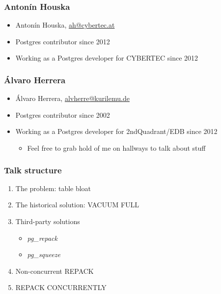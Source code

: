 \newcommand{\linksize}{\scriptsize}


\begin{frame}[plain]
  \titlepage
\end{frame}

\begin{frame}
	\frametitle{Antonín Houska}
  \begin{itemize}
    \item Antonín Houska, \href{mailto:ah@cybertec.at}{ah@cybertec.at}
    \item Postgres contributor since 2012
    \item Working as a Postgres developer for CYBERTEC since 2012
  \end{itemize}
\end{frame}

\begin{frame}
	\frametitle{Álvaro Herrera}
  \begin{itemize}
    \item Álvaro Herrera, \href{mailto:alvherre@kurilemu.de}{alvherre@kurilemu.de}
    \item Postgres contributor since 2002
    \item Working as a Postgres developer for 2ndQuadrant/EDB since 2012
\begin{itemize} \item \linksize Feel free to grab hold of me on hallways to talk about stuff \end{itemize}
  \end{itemize}
\end{frame}

\begin{frame}
  \frametitle{Talk structure}
  \begin{enumerate}
    \item The problem: table bloat
    \item The historical solution: VACUUM FULL
    \item Third-party solutions
	    \begin{itemize}
		    \item \emph{pg\_repack}
		    \item \emph{pg\_squeeze}
	    \end{itemize}
    \item Non-concurrent REPACK
    \item REPACK CONCURRENTLY
  \end{enumerate}
\end{frame}

